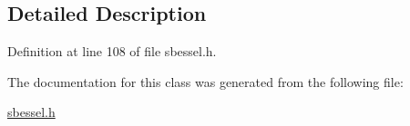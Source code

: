 \subsection{Detailed Description}


Definition at line 108 of file sbessel.\+h.



The documentation for this class was generated from the following file\+:\begin{DoxyCompactItemize}
\item 
\hyperlink{sbessel_8h}{sbessel.\+h}\end{DoxyCompactItemize}
